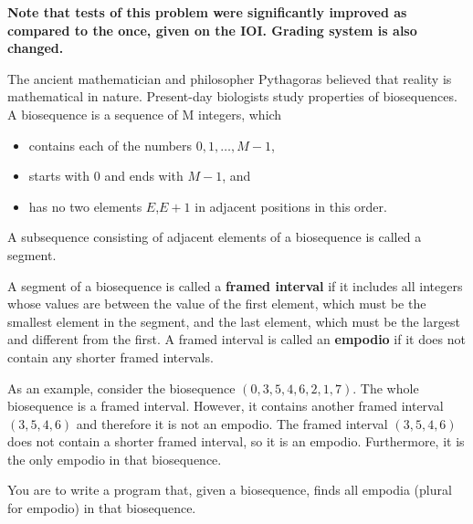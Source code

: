 {\bf Note that tests of this problem were significantly improved as compared to the once, given on the IOI. Grading system is also changed. }

The ancient mathematician and philosopher Pythagoras believed that reality is mathematical in nature. Present-day biologists study properties of biosequences. A biosequence is a sequence of M integers, which 
\begin{itemize}
\item contains each of the numbers $0,1, \ldots ,M-1$,
\item starts with $0$ and ends with $M-1$, and
\item has no two elements $E$,$E+1$ in adjacent positions in this order.
\end{itemize}

A subsequence consisting of adjacent elements of a biosequence is called a segment.

A segment of a biosequence is called a \textbf{framed interval} if it includes all integers whose values are between the value of the first element, which must be the smallest element in the segment, and the last element, which must be the largest and different from the first. A framed interval is called an \textbf{empodio} if it does not contain any shorter framed intervals. 

As an example, consider the biosequence $(0,3,5,4,6,2,1,7)$. The whole biosequence is a framed interval. However, it contains another framed interval $(3,5,4,6)$ and therefore it is not an empodio. The framed interval $(3,5,4,6)$ does not contain a shorter framed interval, so it is an empodio. Furthermore, it is the only empodio in that biosequence. 

You are to write a program that, given a biosequence, finds all empodia (plural for empodio) in that biosequence. 
